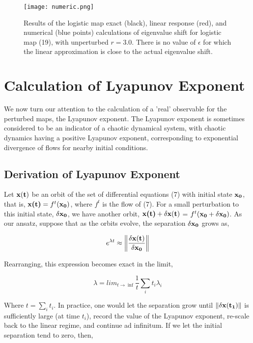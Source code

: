 \documentclass[twocolumn,aip,cha]{revtex4-1}
\begin{document}
\begin{figure}[t]
\begin{centering}
\texttt{[image: numeric.png]}

\caption{Results of the logistic map exact (black), linear response (red), and numerical (blue points) calculations of eigenvalue shift for logistic map (19), with unperturbed $r=3.0$. There is no value of $\epsilon$ for which the linear approximation is close to the actual eigenvalue shift.}

\end{centering}
\end{figure}

\section{Calculation of Lyapunov Exponent}
We now turn our attention to the calculation of a 'real' observable for the perturbed maps, the Lyapunov exponent. The Lyapunov exponent is sometimes considered to be an indicator of a chaotic dynamical system, with chaotic dynamics having a positive Lyapunov exponent, corresponding to exponential divergence of flows for nearby initial conditions.

\subsection{Derivation of Lyapunov Exponent}
Let $\bf x(t)$ be an orbit of the set of differential equations (7) with initial state $\bf x_{0}$, that is, $\textbf{x(t)} = f^{t}(\textbf{$\bf x_0$})$, where $f^t$ is the flow of (7). For a small perturbation to this initial state, $\bf \delta x_{0}$, we have another orbit, $\textbf{x(t)} + \textbf{$\bf \delta x(t)$}$ = $f^{t}(\textbf{$\bf x_{0}$} + \textbf{$\bf \delta x_{0}$})$. As our ansatz, suppose that as the orbits evolve, the separation $\bf \delta x_{0}$ grows as,

\begin{equation}
e^{\lambda t} \approx \left\Vert \frac{\bf \delta x(t)}{\bf \delta x_{0}} \right\Vert
\end{equation}

Rearranging, this expression becomes exact in the limit,

\begin{equation}
\lambda = lim_{t\rightarrow \inf} \frac{1}{t} \sum_{i} t_{i} \lambda_{i}
\end{equation}

Where $t = \sum_{i} t_{i}$. In practice, one would let the separation grow until $\Vert \bf \delta x(t_{1}) \Vert$ is sufficiently large (at time $t_{i}$), record the value of the Lyapunov exponent, re-scale back to the linear regime, and continue ad infinitum.
\indent If we let the initial separation tend to zero, then,
\end{document}
